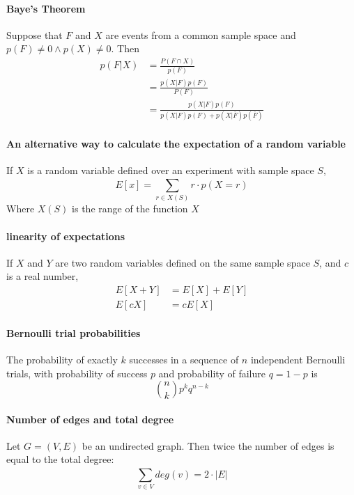 \documentclass[a4paper]{article}
\begin{document}
\paragraph{Baye's Theorem}
Suppose that $F$ and $X$ are events from a common sample space and $p(F) \neq 0 \land p(X) \neq 0$. Then
\begin{align*}
  p(F|X) &= \frac{P(F \cap X)}{p(F)}\\
    &= \frac{p(X|F) p(F)}{P(F)}\\
    &= \frac{p(X|F) p(F)}{p(X|F) p(F) + p(X|\overline{F}) p(\overline{F})}
\end{align*}
\paragraph{An alternative way to calculate the expectation of a random variable}
If $X$ is a random variable defined over an experiment with sample space $S$,
\begin{equation*}
  E[x] = \sum_{r \in X(S)}^{} r \cdot p(X = r)
\end{equation*}
Where $X(S)$ is the range of the function $X$
\paragraph{linearity of expectations}
If $X$ and $Y$ are two random variables defined on the same sample space $S$, and $c$ is a real number,
\begin{align*}
  E[X + Y] &= E[X] + E[Y]\\
  E[cX] &= cE[X]
\end{align*}
\paragraph{Bernoulli trial probabilities}
The probability of exactly $k$ successes in a sequence of $n$ independent Bernoulli trials, with probability of success $p$ and probability of failure $q = 1-p$ is
\begin{equation*}
  \binom{n}{k} p^k q^{n-k}
\end{equation*}
\paragraph{Number of edges and total degree}
Let $G = (V, E)$ be an undirected graph. Then twice the number of edges is equal to the total degree:
\begin{equation*}
  \sum_{v \in V}^{} deg(v) = 2 \cdot |E|
\end{equation*}
\end{document}
